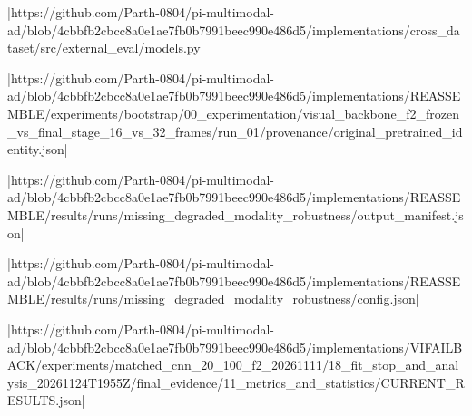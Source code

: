 |https://github.com/Parth-0804/pi-multimodal-ad/blob/4cbbfb2cbcc8a0e1ae7fb0b7991beec990e486d5/implementations/cross_dataset/src/external_eval/models.py|

|https://github.com/Parth-0804/pi-multimodal-ad/blob/4cbbfb2cbcc8a0e1ae7fb0b7991beec990e486d5/implementations/REASSEMBLE/experiments/bootstrap/00_experimentation/visual_backbone_f2_frozen_vs_final_stage_16_vs_32_frames/run_01/provenance/original_pretrained_identity.json|

|https://github.com/Parth-0804/pi-multimodal-ad/blob/4cbbfb2cbcc8a0e1ae7fb0b7991beec990e486d5/implementations/REASSEMBLE/results/runs/missing_degraded_modality_robustness/output_manifest.json|

|https://github.com/Parth-0804/pi-multimodal-ad/blob/4cbbfb2cbcc8a0e1ae7fb0b7991beec990e486d5/implementations/REASSEMBLE/results/runs/missing_degraded_modality_robustness/config.json|

|https://github.com/Parth-0804/pi-multimodal-ad/blob/4cbbfb2cbcc8a0e1ae7fb0b7991beec990e486d5/implementations/VIFAILBACK/experiments/matched_cnn_20_100_f2_20261111/18_fit_stop_and_analysis_20261124T1955Z/final_evidence/11_metrics_and_statistics/CURRENT_RESULTS.json|
